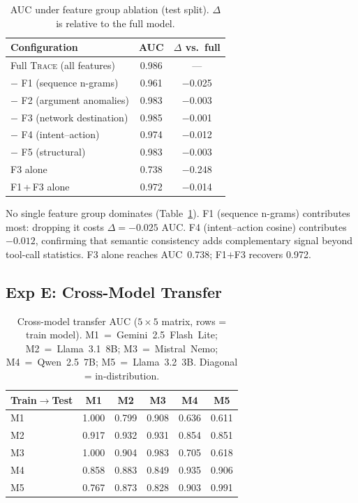 \documentclass[conference]{IEEEtran}
\begin{document}
\begin{table}[t]
\centering
\caption{AUC under feature group ablation (test split).
  $\Delta$ is relative to the full model.}
\label{tab:ablation}
\begin{tabular}{lcc}
\toprule
Configuration & AUC & $\Delta$ vs.\ full \\
\midrule
Full \textsc{Trace} (all features)  & 0.986 & --- \\
\quad $-$ F1 (sequence n-grams)     & 0.961 & $-$0.025 \\
\quad $-$ F2 (argument anomalies)   & 0.983 & $-$0.003 \\
\quad $-$ F3 (network destination)  & 0.985 & $-$0.001 \\
\quad $-$ F4 (intent--action)       & 0.974 & $-$0.012 \\
\quad $-$ F5 (structural)           & 0.983 & $-$0.003 \\
\midrule
F3 alone                            & 0.738 & $-$0.248 \\
F1\,+\,F3 alone                     & 0.972 & $-$0.014 \\
\bottomrule
\end{tabular}
\end{table}

No single feature group dominates (Table~\ref{tab:ablation}).
F1 (sequence n-grams) contributes most: dropping it costs
$\Delta{=}{-}0.025$ AUC.  F4 (intent--action cosine) contributes
$-0.012$, confirming that semantic consistency adds complementary
signal beyond tool-call statistics.  F3 alone reaches AUC~0.738;
F1$+$F3 recovers 0.972.
\subsection{Exp E: Cross-Model Transfer}
\label{sec:exp_e}

\begin{table}[t]
\centering
\caption{Cross-model transfer AUC ($5{\times}5$ matrix, rows = train model).
  M1~=~Gemini~2.5~Flash~Lite; M2~=~Llama~3.1~8B; M3~=~Mistral~Nemo;
  M4~=~Qwen~2.5~7B; M5~=~Llama~3.2~3B.  Diagonal = in-distribution.}
\label{tab:transfer}
\begin{tabular}{lccccc}
\toprule
Train$\!\to$Test & M1 & M2 & M3 & M4 & M5 \\
\midrule
M1 & 1.000 & 0.799 & 0.908 & 0.636 & 0.611 \\
M2 & 0.917 & 0.932 & 0.931 & 0.854 & 0.851 \\
M3 & 1.000 & 0.904 & 0.983 & 0.705 & 0.618 \\
M4 & 0.858 & 0.883 & 0.849 & 0.935 & 0.906 \\
M5 & 0.767 & 0.873 & 0.828 & 0.903 & 0.991 \\
\bottomrule
\end{tabular}
\end{table}
\end{document}
